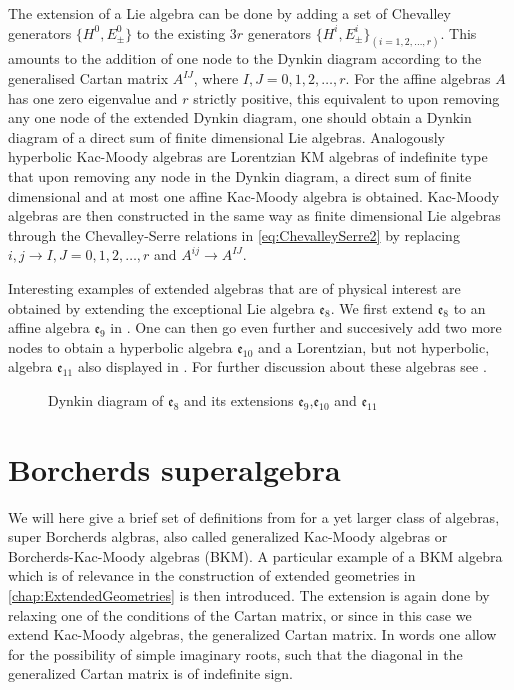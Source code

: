 The extension of a Lie algebra can be done by adding a set of Chevalley generators $\{H^0,E_{\pm}^0\}$ to the existing $3r$ generators $\{H^i,E_\pm^i\}_{(i=1,2,\ldots,r)}$. This amounts to the addition of one node to the Dynkin diagram according to the generalised Cartan matrix $A^{IJ}$, where $I,J=0,1,2,\ldots, r$. For the affine algebras $A$ has one zero eigenvalue and $r$ strictly positive, this equivalent to upon removing any one node of the extended Dynkin diagram, one should obtain a Dynkin diagram of a direct sum of finite dimensional Lie algebras. Analogously hyperbolic Kac-Moody algebras are Lorentzian KM algebras of indefinite type that upon removing any node in the Dynkin diagram, a direct sum of finite dimensional and at most one affine Kac-Moody algebra is obtained. Kac-Moody algebras are then constructed in the same way as finite dimensional Lie algebras through the Chevalley-Serre relations in \eqref{eq:ChevalleySerre2} by replacing $i,j\to I,J=0,1,2,\ldots,r$ and $A^{ij}\to A^{IJ}$.

Interesting examples of extended algebras that are of physical interest are obtained by extending the exceptional Lie algebra $\mathfrak{e}_8$. We first extend $\mathfrak{e}_8$ to an affine algebra $\mathfrak{e}_9$ in . One can then go even further and succesively add two more nodes to obtain a hyperbolic algebra $\mathfrak{e}_{10}$ and a Lorentzian, but not hyperbolic, algebra $\mathfrak{e}_{11}$ also displayed in . For further discussion about these algebras see \cite{PhdJakob2009,PhdDaniel2010}.
\begin{figure}
    \caption{Dynkin diagram of $\mathfrak{e}_8$ and its extensions $\mathfrak{e}_9$,$\mathfrak{e}_{10}$ and $\mathfrak{e}_{11}$}
    \label{fig:DynkinEseries}
\end{figure}


\section{Borcherds superalgebra}\label{sec:Borcherds}

We will here give a brief set of definitions from \cite{Ray2006} for a yet larger class of algebras, super Borcherds algbras, also called generalized Kac-Moody algebras or Borcherds-Kac-Moody algebras (BKM). A particular example of a BKM algebra which is of relevance in the construction of extended geometries in \ref{chap:ExtendedGeometries} is then introduced. The extension is again done by relaxing one of the conditions of the Cartan matrix, or since in this case we extend Kac-Moody algebras, the generalized Cartan matrix. In words one allow for the possibility of simple imaginary roots, such that the diagonal in the generalized Cartan matrix is of indefinite sign.

